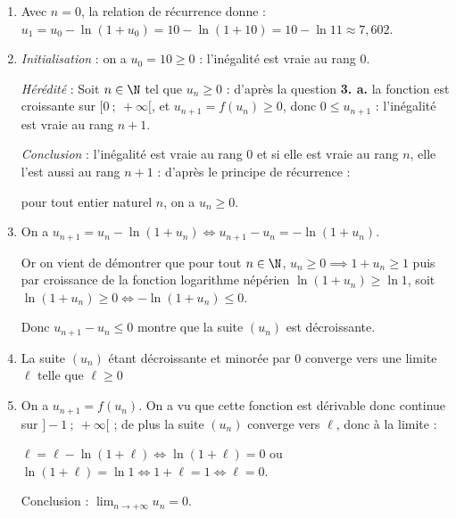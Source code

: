 \begin{enumerate}
\item Avec $n = 0$, la relation de récurrence donne :
$u_1 = u_0 - \ln (1 + u_0) = 10 - \ln (1 + 10) = 10 - \ln 11 \approx 7,602$.

\item %
\emph{Initialisation } : on a $u_0 = 10 \geqslant 0$ : l'inégalité est vraie au rang 0.

\emph{Hérédité } : Soit $n \in \N$ tel que $u_n \geqslant 0$ : d'après la question \textbf{3. a.} la fonction est croissante sur $[0~;~+ \infty[$, et $u_{n+1} = f\left(u_n\right) \geqslant 0$, donc $0 \leqslant u_{n+1}$ : l'inégalité est vraie au rang $n + 1$.

\emph{Conclusion } : l'inégalité est vraie au rang 0 et si elle est vraie au rang $n$, elle l'est aussi au rang $n + 1$ : d'après le principe de récurrence :

pour tout entier naturel $n$, on a $u_n \geqslant 0$.
\item %
On a $u_{n+1} = u_n - \ln \left(1 + u_n\right) \iff u_{n+1} - u_n = - \ln \left(1 + u_n\right)$.

Or on vient de démontrer que pour tout $n \in \N$, \: $u_n \geqslant 0 \implies 1 + u_n \geqslant 1$ puis par croissance de la fonction logarithme népérien $\ln (1 + u_n) \geqslant \ln 1$, soit  $\ln (1 + u_n) \geqslant 0 \iff - \ln (1 + u_n) \leqslant 0$.

Donc $u_{n+1} - u_n \leqslant 0$ montre que la suite $\left(u_n\right)$ est décroissante.
\item %

La suite $\left(u_n\right)$ étant décroissante et minorée par $0$ converge vers une limite $\ell$ telle que $\ell \geqslant 0$
\item %
On a $u_{n+1} = f\left(u_n\right)$. On a vu que cette fonction est dérivable donc continue sur $]- 1~;~+ \infty[$ ; de plus la suite $\left(u_n\right)$ converge vers $\ell$, donc à la limite :

$\ell = \ell - \ln \left(1 + \ell\right) \iff \ln \left(1 + \ell\right) = 0$ ou $\ln \left(1 + \ell\right) = \ln 1 \iff 1 + \ell = 1 \iff \ell = 0$.

Conclusion : $\displaystyle\lim_{n \to + \infty} u_n = 0$.
\end{enumerate}

\medskip

\medskip

